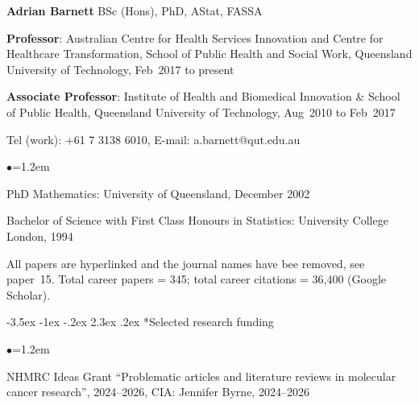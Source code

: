 \documentclass[a4paper,11pt]{article}
\makeatletter
\renewcommand\section{\@startsection {section}{1}{\z@}%
                                   {-3.5ex \@plus -1ex \@minus -.2ex}%
                                   {2.3ex \@plus.2ex}%
                                   {\normalfont\large\bfseries\color{blue}}}
\renewcommand{\labelitemi}{$\bullet$}
\makeatother
\begin{document}
\begin{raggedright}


\begin{center}
\textbf{Adrian Barnett} BSc (Hons), PhD, AStat, FASSA
\end{center}

\textbf{Professor}: Australian Centre for Health Services Innovation and Centre for Healthcare Transformation, School of Public Health and Social Work, Queensland University of Technology, Feb~2017 to present

\textbf{Associate Professor}: Institute of Health and Biomedical Innovation \& School of Public Health, Queensland University of Technology, Aug~2010 to Feb~2017

Tel (work): +61 7 3138 6010, 
E-mail: a.barnett@qut.edu.au

\begin{list}{\labelitemi}{\leftmargin=1.2em}\addtolength{\itemsep}{-0.5\baselineskip}
\item PhD Mathematics: University of Queensland, December 2002
\item Bachelor of Science with First Class Honours in Statistics: University College London, 1994
\end{list}




All papers are hyperlinked and the journal names have bee removed, see paper~15. Total career papers = 345; total career citations = 36,400 (Google Scholar).

\section*{Selected research funding}

\begin{list}{\labelitemi}{\leftmargin=1.2em}\addtolength{\itemsep}{-0.5\baselineskip}

% 
\item NHMRC Ideas Grant ``Problematic articles and literature reviews in molecular cancer research'', 2024--2026, CIA: Jennifer Byrne, 2024--2026



\end{list}
\end{raggedright}
\end{document}
